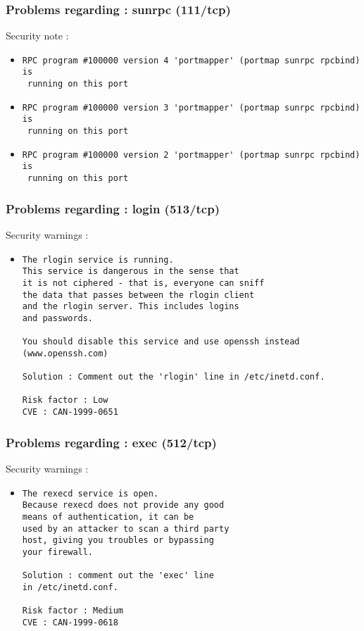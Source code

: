 \documentclass{article}
\begin{document}
\subsubsection{Problems regarding : sunrpc (111/tcp)}
Security note :\\
\begin{itemize}
\item \begin{verbatim}
RPC program #100000 version 4 'portmapper' (portmap sunrpc rpcbind) is
 running on this port
\end{verbatim}\item \begin{verbatim}
RPC program #100000 version 3 'portmapper' (portmap sunrpc rpcbind) is
 running on this port
\end{verbatim}\item \begin{verbatim}
RPC program #100000 version 2 'portmapper' (portmap sunrpc rpcbind) is
 running on this port
\end{verbatim}\end{itemize}
\subsubsection{Problems regarding : login (513/tcp)}
Security warnings :\\
\begin{itemize}
\item \begin{verbatim}
The rlogin service is running.
This service is dangerous in the sense that
it is not ciphered - that is, everyone can sniff
the data that passes between the rlogin client
and the rlogin server. This includes logins
and passwords.

You should disable this service and use openssh instead
(www.openssh.com)

Solution : Comment out the 'rlogin' line in /etc/inetd.conf.

Risk factor : Low
CVE : CAN-1999-0651
\end{verbatim}\end{itemize}
\subsubsection{Problems regarding : exec (512/tcp)}
Security warnings :\\
\begin{itemize}
\item \begin{verbatim}
The rexecd service is open. 
Because rexecd does not provide any good
means of authentication, it can be
used by an attacker to scan a third party
host, giving you troubles or bypassing
your firewall.

Solution : comment out the 'exec' line 
in /etc/inetd.conf.

Risk factor : Medium
CVE : CAN-1999-0618
\end{verbatim}\end{itemize}
\end{document}
